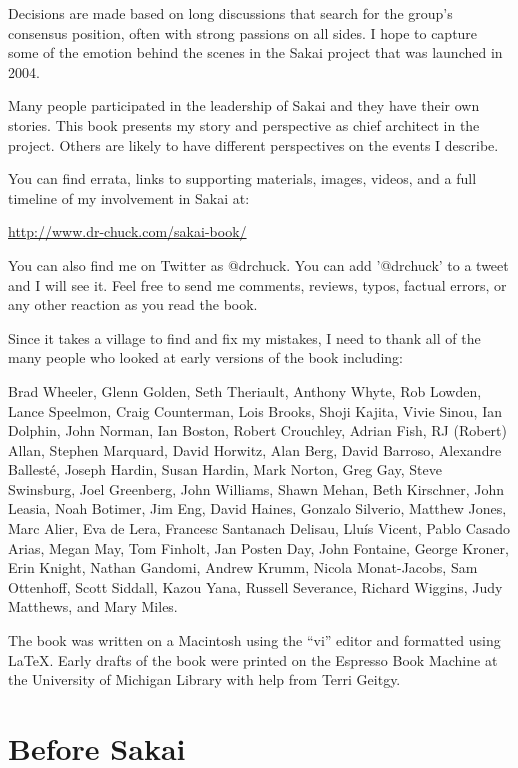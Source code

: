 \documentclass[12pt]{book}
\begin{document}
Decisions are made based on long discussions that search
for the group's consensus position, often with strong
passions on all sides. I hope to capture
some of the emotion behind the scenes in the Sakai project
that was launched in 2004.

Many people participated in the leadership of Sakai and they
have their own stories.  This book presents my story and perspective
as chief architect in the project.  Others
are likely to have different perspectives on the events
I describe.

You can find errata, links to supporting materials, images,
videos, and a full timeline of my involvement in Sakai at:

\url{http://www.dr-chuck.com/sakai-book/}

You can also find me on Twitter as @drchuck.  You can
add '@drchuck' to a tweet and I will see it.  Feel free
to send me comments, reviews, typos, factual errors, or
any other reaction as you read the book.

Since it takes a village to find and fix my mistakes, I
need to thank all of the many people who looked at early versions
of the book including:

Brad Wheeler, Glenn Golden, Seth Theriault, Anthony Whyte, Rob Lowden, Lance Speelmon, Craig Counterman, Lois Brooks, Shoji Kajita, Vivie Sinou, Ian Dolphin, John Norman, Ian Boston, Robert Crouchley, Adrian Fish, RJ (Robert) Allan, Stephen Marquard, David Horwitz, Alan Berg, David Barroso, Alexandre Ballest\'e, Joseph Hardin, Susan Hardin, Mark Norton, Greg Gay, Steve Swinsburg, Joel Greenberg, John Williams, Shawn Mehan, Beth Kirschner, John Leasia, Noah Botimer, Jim Eng, David Haines, Gonzalo Silverio, Matthew Jones, Marc Alier, Eva de Lera, Francesc Santanach Delisau, Llu\'is Vicent, Pablo Casado Arias, Megan May, Tom Finholt, Jan Posten Day, John Fontaine, George Kroner, Erin Knight, Nathan Gandomi, Andrew Krumm, Nicola Monat-Jacobs, Sam Ottenhoff, Scott Siddall, Kazou Yana, Russell Severance, Richard Wiggins, Judy Matthews, and Mary Miles.

The book was written on a Macintosh using the ``vi'' editor and
formatted using LaTeX.  Early drafts of the book were printed
on the Espresso Book Machine at the University of Michigan Library
with help from Terri Geitgy.

\tableofcontents

\mainmatter

\chapter{Before Sakai}
\end{document}
